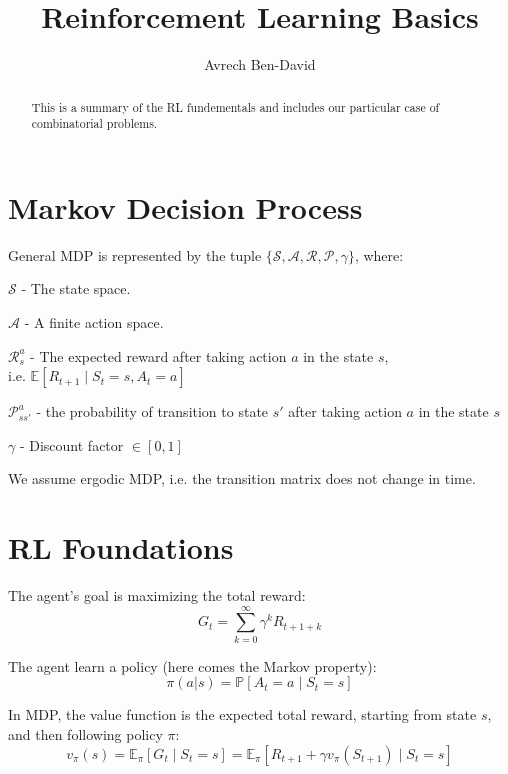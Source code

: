 \documentclass[10pt,a4paper,draft]{article}
\begin{document}
\title{Reinforcement Learning Basics}
\author{Avrech Ben-David}
\maketitle
\begin{abstract}
This is a summary of the RL fundementals and includes our particular case of combinatorial problems. 
\end{abstract}
\section{Markov Decision Process}
General MDP is represented by the tuple $\{\mathcal{S,A,R,P},\gamma\}$, where:
\begin{list}{•}{}
	\item $\mathcal{S}$ - The state space.
	\item $\mathcal{A}$ - A finite action space.
	\item $\mathcal{R}_s^a$ - The expected reward after taking action $a$ in the state $s$, \\ i.e. $\mathbb{E}[R_{t+1} \mid S_t = s, A_t = a]$
	\item $\mathcal{P}_{ss'}^a$ - the probability of transition to state $s'$ after taking action $a$ in the state $s$
	\item $\mathcal{\gamma}$ - Discount factor $\in [0,1]$

\end{list}
We assume ergodic MDP, i.e. the transition matrix does not change in time.

\section{RL Foundations}
The agent's goal is maximizing the total reward:
\begin{equation}
G_t = \sum_{k=0}^{\infty} \gamma^kR_{t+1+k}
\end{equation}

The agent learn a policy (here comes the Markov property):
\begin{equation}
\pi(a|s) = \mathbb{P}[A_t = a \mid S_t = s]
\label{policy_def}
\end{equation}

In MDP, the value function is the expected total reward, starting from state $s$, and then following policy $\pi$:
\begin{equation}
v_{\pi}(s) = \mathbb{E}_{\pi}[G_t \mid S_t = s] = \mathbb{E}_{\pi}[R_{t+1} + \gamma v_{\pi}(S_{t+1}) \mid S_t = s]
\label{vf_def}
\end{equation}
\end{document}
